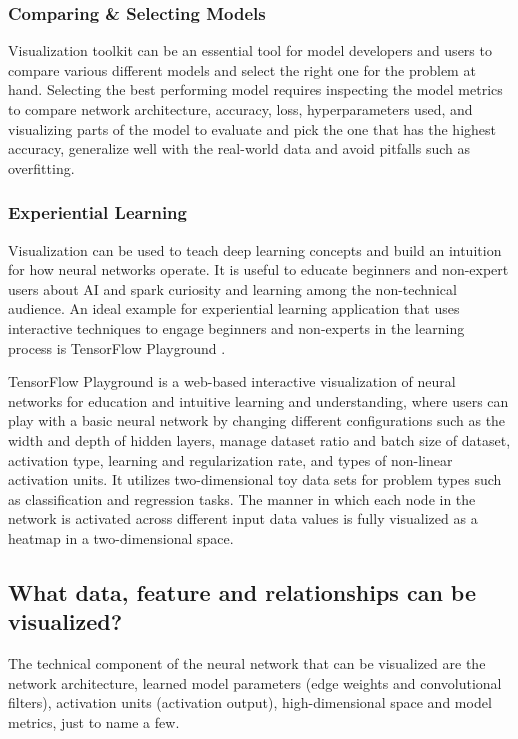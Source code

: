 \subsubsection*{Comparing \& Selecting Models}

Visualization toolkit can be an essential tool for model developers and users to compare various different models and select the right one for the problem at hand. Selecting the best performing model requires inspecting the model metrics to compare network architecture, accuracy, loss, hyperparameters used, and visualizing parts of the model to evaluate and pick the one that has the highest accuracy, generalize well with the real-world data and avoid pitfalls such as overfitting.

\subsubsection*{Experiential Learning}

Visualization can be used to teach deep learning concepts and build an intuition for how neural networks operate. It is useful to educate beginners and non-expert users about AI and spark curiosity and learning among the non-technical audience. An ideal example for experiential learning application that uses interactive techniques to engage beginners and non-experts in the learning process is TensorFlow Playground \cite{edsarx.1708.0378820170101}.

TensorFlow Playground is a web-based interactive visualization of neural networks for education and intuitive learning and understanding, where users can play with a basic neural network by changing different configurations such as the width and depth of hidden layers, manage dataset ratio and batch size of dataset, activation type, learning and regularization rate, and types of non-linear activation units. It utilizes two-dimensional toy data sets for problem types such as classification and regression tasks. The manner in which each node in the network is activated across different input data values is fully visualized as a heatmap in a two-dimensional space.

\subsection*{What data, feature and relationships can be visualized?}

The technical component of the neural network that can be visualized are the network architecture, learned model parameters (edge weights and convolutional filters),  activation units (activation output), high-dimensional space and model metrics, just to name a few.

